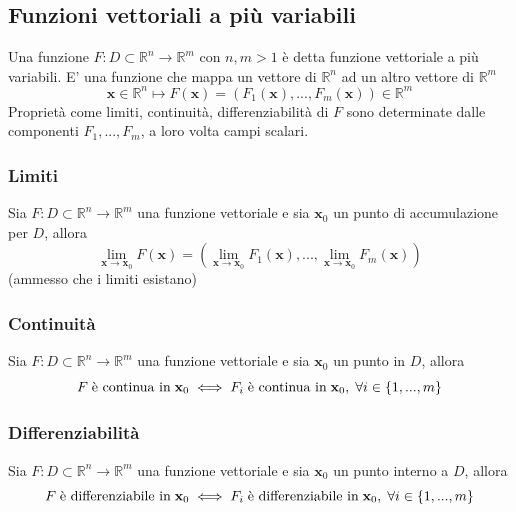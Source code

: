 \documentclass{article}
\begin{document}
        \newpage
        \subsection{Funzioni vettoriali a più variabili}
            Una funzione $F: D \subset \mathbb{R}^{n} \rightarrow \mathbb{R}^{m}$ con $n, m > 1$ è detta funzione vettoriale a più variabili. E' una funzione che mappa un vettore di $\mathbb{R}^{n}$ ad un altro vettore di $\mathbb{R}^{m}$
            \[
                \mathbf{x} \in \mathbb{R}^{n} \mapsto F(\mathbf{x}) = (F_{1}(\mathbf{x}), ..., F_{m}(\mathbf{x})) \in \mathbb{R}^{m}
            \]
            Proprietà come limiti, continuità, differenziabilità di $F$ sono determinate dalle componenti $F_{1}, ..., F_{m}$, a loro volta campi scalari.

            \subsubsection{Limiti}
                Sia $F: D \subset \mathbb{R}^{n} \rightarrow \mathbb{R}^{m}$ una funzione vettoriale e sia $\mathbf{x}_0$ un punto di accumulazione per $D$, allora
                \[
                    \lim_{\mathbf{x} \rightarrow \mathbf{x}_0} F(\mathbf{x}) = (\lim_{\mathbf{x} \rightarrow \mathbf{x}_0} F_{1}(\mathbf{x}), ..., \lim_{\mathbf{x} \rightarrow \mathbf{x}_0} F_{m}(\mathbf{x}))
                \]
                (ammesso che i limiti esistano)
            
            \subsubsection{Continuità}
                Sia $F: D \subset \mathbb{R}^{n} \rightarrow \mathbb{R}^{m}$ una funzione vettoriale e sia $\mathbf{x}_0$ un punto in $D$, allora
                \[
                    F \; \textnormal{è continua in} \; \mathbf{x}_0 \iff F_{i} \; \textnormal{è continua in} \; \mathbf{x}_0, \; \forall i \in \{1, ..., m\}
                \]

            \subsubsection{Differenziabilità}
                Sia $F: D \subset \mathbb{R}^{n} \rightarrow \mathbb{R}^{m}$ una funzione vettoriale e sia $\mathbf{x}_0$ un punto interno a $D$, allora
                \[
                    F \; \textnormal{è differenziabile in} \; \mathbf{x}_0 \iff F_{i} \; \textnormal{è differenziabile in} \; \mathbf{x}_0, \; \forall i \in \{1, ..., m\}
                \]
\end{document}
